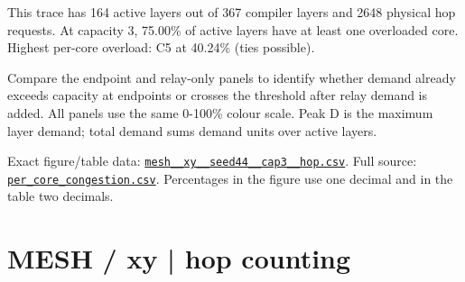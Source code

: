\documentclass[10pt,a4paper]{article}
\begin{document}
This trace has 164 active layers out of 367 compiler layers and 2648 physical hop requests. At capacity 3, 75.00\% of active layers have at least one overloaded core. Highest per-core overload: C5 at 40.24\% (ties possible).\par
Compare the endpoint and relay-only panels to identify whether demand already exceeds capacity at endpoints or crosses the threshold after relay demand is added. All panels use the same 0-100\% colour scale. Peak D is the maximum layer demand; total demand sums demand units over active layers.\par
Exact figure/table data: \href{\detokenize{file:///home/dhruv-pansuriya/Documents/BTP/Compiler-Driven-ACE/output/pdf/qaoa_methods_congestion/tables/mesh__xy__seed44__cap3__hop.csv}}{\nolinkurl{mesh__xy__seed44__cap3__hop.csv}}. Full source: \href{\detokenize{file:///home/dhruv-pansuriya/Documents/BTP/Compiler-Driven-ACE/results/qaoa_2seed_2026-10-26/congestion/per_core_congestion.csv}}{\nolinkurl{per_core_congestion.csv}}. Percentages in the figure use one decimal and in the table two decimals.\par
\clearpage
\section*{MESH / xy | hop counting}
\end{document}
